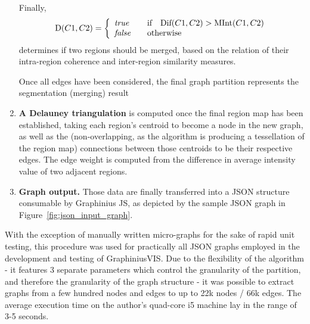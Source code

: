 \begin{enumerate}
			\par Finally,
			\begin{equation*}
			\text{D}(C1,C2) = \left\{
			\begin{array}{l l}
			\textit{true} & \quad \text{if} \quad \text{Dif}(C1,C2) > \text{MInt}(C1,C2)\\
			\textit{false} & \quad \text{otherwise}
			\end{array} \right.
			\end{equation*}
			determines if two regions should be merged, based on the relation of their intra-region coherence and inter-region similarity measures.
			
			\par Once all edges have been considered, the final graph partition represents the segmentation (merging) result
		
		\item \textbf{A Delauney triangulation} is computed once the final region map has been established, taking each region's centroid to become a node in the new graph, as well as the (non-overlapping, as the algorithm is producing a tessellation of the region map) connections between those centroids to be their respective edges. The edge weight is computed from the difference in average intensity value of two adjacent regions.

		\item \textbf{Graph output.} Those data are finally transferred into a JSON structure consumable by Graphinius JS, as depicted by the sample JSON graph in Figure~\ref{fig:json_input_graph}.
	\end{enumerate}
	
	With the exception of manually written micro-graphs for the sake of rapid unit testing, this procedure was used for practically all JSON graphs  employed in the development and testing of GraphiniusVIS. Due to the flexibility of the algorithm - it features 3 separate parameters which control the granularity of the partition, and therefore the granularity of the graph structure - it was possible to extract graphs from a few hundred nodes and edges to up to 22k nodes / 66k edges. The average execution time on the author's quad-core i5 machine lay in the range of 3-5 seconds.
		
